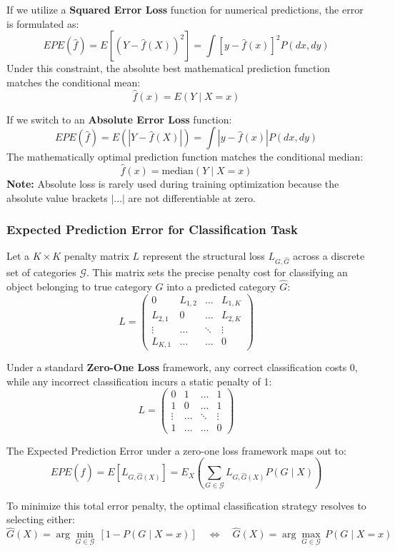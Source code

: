 \documentclass{article}
\begin{document}
If we utilize a \textbf{Squared Error Loss} function for numerical predictions, the error is formulated as:
\[ EPE(\hat{f}) = E\left[(Y - \hat{f}(X))^2\right] = \int [y - \hat{f}(x)]^2 P(dx,dy) \]
Under this constraint, the absolute best mathematical prediction function matches the conditional mean:
\[ \hat{f}(x) = E(Y \mid X = x) \]

If we switch to an \textbf{Absolute Error Loss} function:
\[ EPE(\hat{f}) = E(|Y-\hat{f}(X)|) = \int |y-\hat{f}(x)| P(dx,dy) \]
The mathematically optimal prediction function matches the conditional median:
\[ \hat{f}(x) = \text{median}(Y \mid X = x) \]
\textbf{Note:} Absolute loss is rarely used during training optimization because the absolute value brackets $| \dots |$ are not differentiable at zero.

\subsubsection{Expected Prediction Error for Classification Task}
Let a $K \times K$ penalty matrix $L$ represent the structural loss $L_{G,\hat{G}}$ across a discrete set of categories $\mathcal{G}$. This matrix sets the precise penalty cost for classifying an object belonging to true category $G$ into a predicted category $\hat{G}$:
\[ L = \begin{pmatrix}
  0 & L_{1,2} & \dots & L_{1,K} \\
  L_{2,1} & 0 & \dots & L_{2,K} \\
  \vdots & \dots & \ddots & \vdots \\
  L_{K,1} & \dots & \dots & 0
\end{pmatrix} \]

Under a standard \textbf{Zero-One Loss} framework, any correct classification costs 0, while any incorrect classification incurs a static penalty of 1:
\[ L = \begin{pmatrix}
  0 & 1 & \dots & 1 \\
  1 & 0 & \dots & 1 \\
  \vdots & \dots & \ddots & \vdots \\
  1 & \dots & \dots & 0
\end{pmatrix} \]

The Expected Prediction Error under a zero-one loss framework maps out to:
\[ EPE(\hat{f}) = E\left[L_{G,\hat{G}(X)}\right] = E_X\left(\sum_{G \in \mathcal{G}} L_{G,\hat{G}(X)} P(G \mid X)\right) \]

To minimize this total error penalty, the optimal classification strategy resolves to selecting either:
\[ \hat{G}(X) = \arg\min_{G \in \mathcal{G}} \, [1 - P(G \mid X = x)] \quad \Longleftrightarrow \quad \hat{G}(X) = \arg\max_{G \in \mathcal{G}} \, P(G \mid X = x) \]
\end{document}
